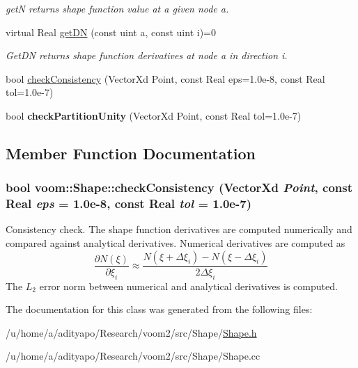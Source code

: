 \begin{DoxyCompactItemize}
\begin{DoxyCompactList}\small\item\em getN returns shape function value at a given node a. \item\end{DoxyCompactList}\item 
\hypertarget{classvoom_1_1_shape_a20d58544fca8f4c8a9360323204c2827}{
virtual Real \hyperlink{classvoom_1_1_shape_a20d58544fca8f4c8a9360323204c2827}{getDN} (const uint a, const uint i)=0}
\label{classvoom_1_1_shape_a20d58544fca8f4c8a9360323204c2827}

\begin{DoxyCompactList}\small\item\em GetDN returns shape function derivatives at node a in direction i. \item\end{DoxyCompactList}\item 
bool \hyperlink{classvoom_1_1_shape_a537587e56cf87b452bbd492261e8f504}{checkConsistency} (VectorXd Point, const Real eps=1.0e-\/8, const Real tol=1.0e-\/7)
\item 
\hypertarget{classvoom_1_1_shape_ab4fc3acfc7036908e4d87b58cf15960a}{
bool {\bfseries checkPartitionUnity} (VectorXd Point, const Real tol=1.0e-\/7)}
\label{classvoom_1_1_shape_ab4fc3acfc7036908e4d87b58cf15960a}

\end{DoxyCompactItemize}


\subsection{Member Function Documentation}
\hypertarget{classvoom_1_1_shape_a537587e56cf87b452bbd492261e8f504}{
\subsubsection[{checkConsistency}]{\setlength{\rightskip}{0pt plus 5cm}bool voom::Shape::checkConsistency (VectorXd {\em Point}, \/  const Real {\em eps} = {\ttfamily 1.0e-\/8}, \/  const Real {\em tol} = {\ttfamily 1.0e-\/7})}}
\label{classvoom_1_1_shape_a537587e56cf87b452bbd492261e8f504}
Consistency check. The shape function derivatives are computed numerically and compared against analytical derivatives. Numerical derivatives are computed as \[ \frac{\partial N(\xi)}{\partial \xi_i} \approx \frac{ N(\xi + \Delta \xi_i) - N(\xi - \Delta \xi_i) }{2\Delta \xi_i} \] The $L_2$ error norm between numerical and analytical derivatives is computed. 

The documentation for this class was generated from the following files:\begin{DoxyCompactItemize}
\item 
/u/home/a/adityapo/Research/voom2/src/Shape/\hyperlink{_shape_8h}{Shape.h}\item 
/u/home/a/adityapo/Research/voom2/src/Shape/Shape.cc\end{DoxyCompactItemize}
